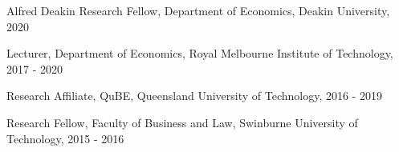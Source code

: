 \documentclass[letterpaper]{article}
\renewenvironment{itemize}{
  \begin{list}{}{
    \setlength{\leftmargin}{1.5em}
  }
}{
  \end{list}
}
\begin{document}
\begin{itemize}
	
	\item Alfred Deakin Research Fellow, Department of Economics, Deakin University, 2020
	
	\item Lecturer, Department of Economics, Royal Melbourne Institute of Technology, 2017 - 2020
	
	\item Research Affiliate, QuBE, Queensland University of Technology, 2016 - 2019
	
	\item Research Fellow, Faculty of Business and Law, Swinburne University of Technology, 2015 - 2016
	
\end{itemize}
\end{document}
